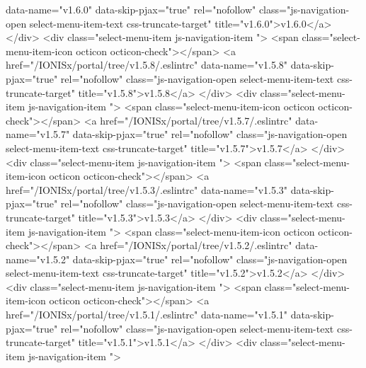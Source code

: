                  data-name="v1.6.0"
                 data-skip-pjax="true"
                 rel="nofollow"
                 class="js-navigation-open select-menu-item-text css-truncate-target"
                 title="v1.6.0">v1.6.0</a>
            </div>
            <div class="select-menu-item js-navigation-item ">
              <span class="select-menu-item-icon octicon octicon-check"></span>
              <a href="/IONISx/portal/tree/v1.5.8/.eslintrc"
                 data-name="v1.5.8"
                 data-skip-pjax="true"
                 rel="nofollow"
                 class="js-navigation-open select-menu-item-text css-truncate-target"
                 title="v1.5.8">v1.5.8</a>
            </div>
            <div class="select-menu-item js-navigation-item ">
              <span class="select-menu-item-icon octicon octicon-check"></span>
              <a href="/IONISx/portal/tree/v1.5.7/.eslintrc"
                 data-name="v1.5.7"
                 data-skip-pjax="true"
                 rel="nofollow"
                 class="js-navigation-open select-menu-item-text css-truncate-target"
                 title="v1.5.7">v1.5.7</a>
            </div>
            <div class="select-menu-item js-navigation-item ">
              <span class="select-menu-item-icon octicon octicon-check"></span>
              <a href="/IONISx/portal/tree/v1.5.3/.eslintrc"
                 data-name="v1.5.3"
                 data-skip-pjax="true"
                 rel="nofollow"
                 class="js-navigation-open select-menu-item-text css-truncate-target"
                 title="v1.5.3">v1.5.3</a>
            </div>
            <div class="select-menu-item js-navigation-item ">
              <span class="select-menu-item-icon octicon octicon-check"></span>
              <a href="/IONISx/portal/tree/v1.5.2/.eslintrc"
                 data-name="v1.5.2"
                 data-skip-pjax="true"
                 rel="nofollow"
                 class="js-navigation-open select-menu-item-text css-truncate-target"
                 title="v1.5.2">v1.5.2</a>
            </div>
            <div class="select-menu-item js-navigation-item ">
              <span class="select-menu-item-icon octicon octicon-check"></span>
              <a href="/IONISx/portal/tree/v1.5.1/.eslintrc"
                 data-name="v1.5.1"
                 data-skip-pjax="true"
                 rel="nofollow"
                 class="js-navigation-open select-menu-item-text css-truncate-target"
                 title="v1.5.1">v1.5.1</a>
            </div>
            <div class="select-menu-item js-navigation-item ">
